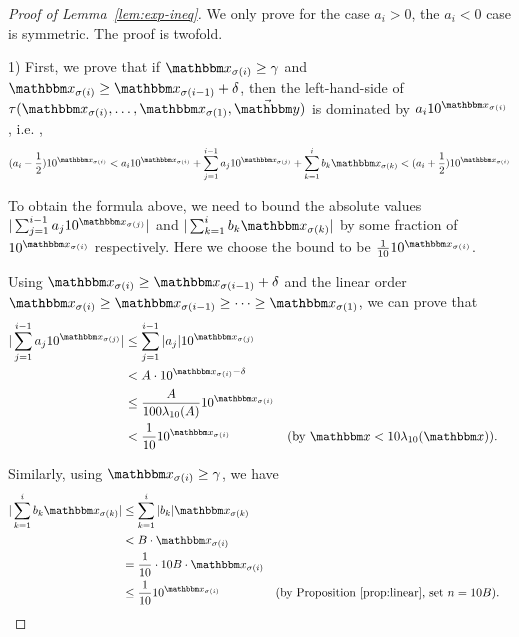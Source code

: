 \begin{proof}[Proof of Lemma~\ref{lem:exp-ineq}]
We only prove for the case $a_i > 0$, the $a_i < 0$ case is symmetric. The proof is twofold.

1) First, we prove that if $\ivarx_{\sigma(i)}\ge \gamma$ and $\ivarx_{\sigma(i)} \ge \ivarx_{\sigma(i-1)} + \delta$, then the left-hand-side of $\tau(\ivarx_{\sigma(i)}, \ldots, \ivarx_{\sigma(1)}, \vec{\ivary})$ is dominated by $a_i 10^{\ivarx_{\sigma(i)}}$, i.e. ,
\begin{equation} \label{eq:bound}
(a_i-\frac{1}{2})10^{\ivarx_{\sigma(i)}}
< a_i 10^{\ivarx_{\sigma(i)}}+\sum_{j=1}^{i-1} a_j 10^{\ivarx_{\sigma(j)}} + \sum_{k=1}^{i}b_k \ivarx_{\sigma(k)}
< (a_i+\frac{1}{2})10^{\ivarx_{\sigma(i)}}
\end{equation}

To obtain the formula above, we need to bound the absolute values $\vert\sum_{j=1}^{i-1}a_j10^{\ivarx_{\sigma(j)}}\vert$ and  $\vert\sum_{k=1}^i b_k\ivarx_{\sigma(k)}\vert$ by some fraction of $10^{\ivarx_{\sigma(i)}}$ respectively. Here we choose the bound to be $\frac{1}{10}10^{\ivarx_{\sigma(i)}}$.

Using $\ivarx_{\sigma(i)}\ge \ivarx_{\sigma(i-1)}+\delta$ and the linear order $\ivarx_{\sigma(i)}\ge \ivarx_{\sigma(i-1)} \ge \cdots \ge \ivarx_{\sigma(1)}$,
we can prove that 
\begin{equation}\label{eq:appr-exp}
    \begin{aligned}
        \vert \sum_{j=1}^{i-1}a_j10^{\ivarx_{\sigma(j)}} \vert &\le  \sum_{j=1}^{i-1} \vert a_j\vert 10^{\ivarx_{\sigma(j)}}\\
        &< A\cdot 10^{\ivarx_{\sigma(i)}-\delta}\\
        &\le \frac{A}{100\lambda_{10}(A)} 10^{\ivarx_{\sigma(i)}}\\
        &< \frac{1}{10} 10^{\ivarx_{\sigma(i)}} && \text{(by $\ivarx < 10 \lambda_{10}(\ivarx)$)}.
    \end{aligned}
\end{equation}

Similarly, using $\ivarx_{\sigma(i)}\ge \gamma$, we have
\begin{equation}\label{eq:appr-linear}
    \begin{aligned}
        \vert \sum_{k=1}^i b_k\ivarx_{\sigma(k)} \vert &\le \sum_{k=1}^i \vert b_k \vert \ivarx_{\sigma(k)} \\
        &< B \cdot \ivarx_{\sigma(i)}\\
        &=\frac{1}{10}\cdot 10B \cdot \ivarx_{\sigma(i)}\\
        &\le \frac{1}{10} 10^{\ivarx_{\sigma(i)}} &&\text{(by Proposition~\ref{prop:linear}, set $n=10B$)}.     
    \end{aligned}
\end{equation}


\end{proof}
